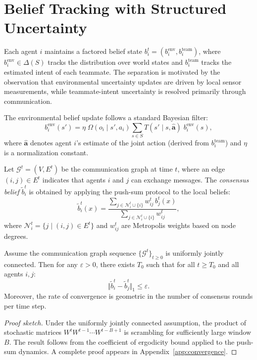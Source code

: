\section{Belief Tracking with Structured Uncertainty}
\label{sec:badc-structure}

Each agent $i$ maintains a factored belief state $b_i^t = (b_i^{\text{env}}, b_i^{\text{team}})$,
where $b_i^{\text{env}} \in \Delta(S)$ tracks the distribution over world states
and $b_i^{\text{team}}$ tracks the estimated intent of each teammate. The
separation is motivated by the observation that environmental uncertainty updates
are driven by local sensor measurements, while teammate-intent uncertainty is
resolved primarily through communication.

The environmental belief update follows a standard Bayesian filter:
\begin{equation}
  b_i^{\text{env}}(s') = \eta \; \Omega(o_i \mid s', a_i) \sum_{s \in S} T(s' \mid s, \mathbf{\hat{a}}) \; b_i^{\text{env}}(s),
  \label{eq:bayes}
\end{equation}
where $\mathbf{\hat{a}}$ denotes agent $i$'s estimate of the joint action
(derived from $b_i^{\text{team}}$) and $\eta$ is a normalization constant.

\begin{definition}
  Let $\mathcal{G}^t = (V, E^t)$ be the communication graph at time $t$, where
  an edge $(i, j) \in E^t$ indicates that agents $i$ and $j$ can exchange messages.
  The \emph{consensus belief} $\tilde{b}_i^t$ is obtained by applying the push-sum
  protocol to the local beliefs:
  \begin{equation}
    \tilde{b}_i^{t}(x) = \frac{\sum_{j \in \mathcal{N}_i^t \cup \{i\}} w_{ij}^t \, b_j^t(x)}
                               {\sum_{j \in \mathcal{N}_i^t \cup \{i\}} w_{ij}^t},
  \end{equation}
  where $\mathcal{N}_i^t = \{j \mid (i, j) \in E^t\}$ and $w_{ij}^t$ are
  Metropolis weights based on node degrees.
\end{definition}

\begin{theorem}
  \label{thm:convergence}
  Assume the communication graph sequence $\{\mathcal{G}^t\}_{t \geq 0}$ is
  uniformly jointly connected. Then for any $\varepsilon > 0$, there exists
  $T_0$ such that for all $t \geq T_0$ and all agents $i, j$:
  \begin{equation}
    \Vert \tilde{b}_i^t - \tilde{b}_j^t \Vert_1 \leq \varepsilon.
  \end{equation}
  Moreover, the rate of convergence is geometric in the number of consensus rounds
  per time step.
\end{theorem}

\begin{proof}[Proof sketch]
  Under the uniformly jointly connected assumption, the product of stochastic
  matrices $W^t W^{t-1} \cdots W^{t-B+1}$ is scrambling for sufficiently large
  window $B$. The result follows from the coefficient of ergodicity bound
  \citep{seneta2006nonnegative} applied to the push-sum dynamics. A complete
  proof appears in Appendix~\ref{app:convergence}.
\end{proof}
